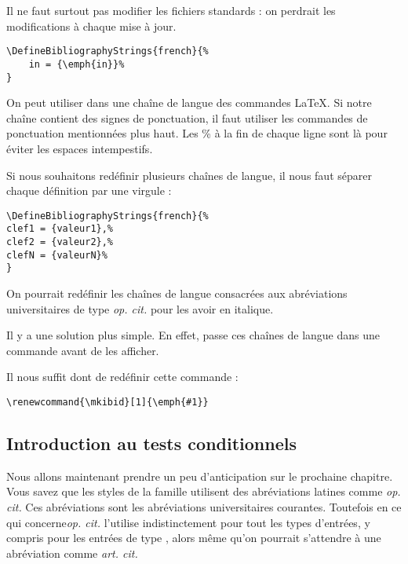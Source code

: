 	\begin{attention}
	Il ne faut surtout pas modifier les fichiers standards : on perdrait les modifications à chaque mise à jour.
	\end{attention}
	
	\begin{verbatim}
\DefineBibliographyStrings{french}{%
	in = {\emph{in}}%
}
	\end{verbatim}
	
	On peut utiliser dans une chaîne de langue des commandes \LaTeX. Si notre chaîne contient des signes de ponctuation, il faut utiliser les commandes de ponctuation mentionnées plus haut. Les \% à la fin de chaque ligne sont là pour éviter les espaces intempestifs.
	
	Si nous souhaitons redéfinir plusieurs chaînes de langue, il nous faut séparer chaque définition par une virgule :
	
	\begin{verbatim}
\DefineBibliographyStrings{french}{%
clef1 = {valeur1},%
clef2 = {valeur2},%
clefN = {valeurN}%
}
	\end{verbatim}

\begin{plusloins}
On pourrait redéfinir les chaînes de langue consacrées aux abréviations universitaires de type \emph{op. cit.} pour les avoir en italique. 

Il y a une solution plus simple\label{mkibid}. En effet,  passe ces chaînes de langue dans une commande  avant de les afficher.

Il nous suffit dont de redéfinir cette commande :
\begin{verbatim}
\renewcommand{\mkibid}[1]{\emph{#1}}
\end{verbatim}
\end{plusloins}

\subsection{Introduction au tests conditionnels}\label{opcit}

Nous allons maintenant prendre un peu d'anticipation sur le prochaine chapitre.
Vous savez  que les styles de la famille  utilisent des abréviations latines comme \emph{op. cit.}
Ces abréviations sont les abréviations universitaires courantes. Toutefois en ce qui concerne\emph{op. cit.}  l'utilise indistinctement pour tout les types d'entrées, y compris pour les entrées de type , alors même qu'on pourrait s'attendre à une abréviation comme \emph{art. cit.}


